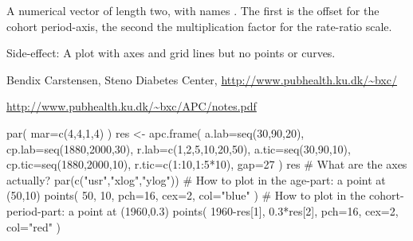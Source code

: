 \begin{Value}
A numerical vector of length two, with names
. The first is the offset for the cohort
period-axis, the second the multiplication factor for the rate-ratio
scale.

Side-effect: A plot with axes and grid lines but no points or curves.
\end{Value}
\begin{Author}\relax
Bendix Carstensen, Steno Diabetes Center,
\url{http://www.pubhealth.ku.dk/~bxc/}
\end{Author}
\begin{References}\relax
\url{http://www.pubhealth.ku.dk/~bxc/APC/notes.pdf}
\end{References}
\begin{SeeAlso}\relax
{}
\end{SeeAlso}
\begin{Examples}
\begin{ExampleCode}
par( mar=c(4,4,1,4) )
res <-
apc.frame( a.lab=seq(30,90,20), cp.lab=seq(1880,2000,30), r.lab=c(1,2,5,10,20,50),
           a.tic=seq(30,90,10), cp.tic=seq(1880,2000,10), r.tic=c(1:10,1:5*10),
           gap=27 )
res
# What are the axes actually?
par(c("usr","xlog","ylog"))
# How to plot in the age-part: a point at (50,10)
points( 50, 10, pch=16, cex=2, col="blue" )
# How to plot in the cohort-period-part: a point at (1960,0.3)
points( 1960-res[1], 0.3*res[2], pch=16, cex=2, col="red" )
\end{ExampleCode}
\end{Examples}

